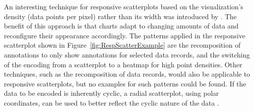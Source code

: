 An interesting technique for responsive scatterplots based on the
visualization's density (data points per pixel) rather than its width
was introduced by \textcite{NickRabinowitzRDV}. The benefit of this
approach is that charts adapt to changing amounts of data and
reconfigure their appearance accordingly. The patterns applied in the
responsive scatterplot shown in Figure~\ref{fig:RespScatterExample}
are the recomposition of annotations to only show annotations for
selected data records, and the switching of the encoding from a
scatterplot to a heatmap for high point densities. Other techniques,
such as the recomposition of data records, would also be applicable to
responsive scatterplots, but no examples for such patterns could be
found. If the data to be encoded is inherently cyclic, a radial
scatterplot, using polar coordinates, can be used to better reflect
the cyclic nature of the data \parencite{RespRadialScatterHLine}.



